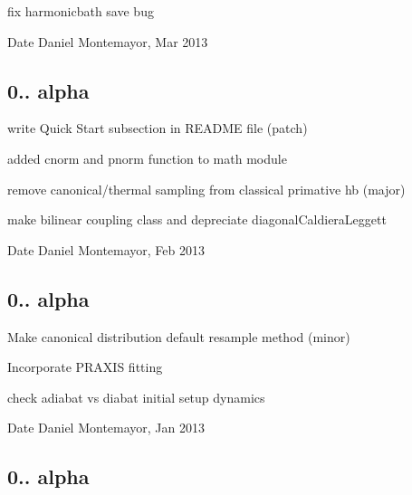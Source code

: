 \begin{DoxyItemize}
\item fix harmonicbath save bug \begin{DoxyDate}{Date}
Daniel Montemayor, Mar 2013
\end{DoxyDate}

\end{DoxyItemize}\hypertarget{_tags_v0_1_3a}{}\subsection{0.. alpha}\label{_tags_v0_1_3a}

\begin{DoxyItemize}
\item write Quick Start subsection in R\-E\-A\-D\-M\-E file (patch)
\item added cnorm and pnorm function to math module
\item remove canonical/thermal sampling from classical primative hb (major)
\item make bilinear coupling class and depreciate diagonal\-Caldiera\-Leggett \begin{DoxyDate}{Date}
Daniel Montemayor, Feb 2013
\end{DoxyDate}

\end{DoxyItemize}\hypertarget{_tags_v0_1_2a}{}\subsection{0.. alpha}\label{_tags_v0_1_2a}

\begin{DoxyItemize}
\item Make canonical distribution default resample method (minor)
\item Incorporate P\-R\-A\-X\-I\-S fitting
\item check adiabat vs diabat initial setup dynamics \begin{DoxyDate}{Date}
Daniel Montemayor, Jan 2013
\end{DoxyDate}

\end{DoxyItemize}\hypertarget{_tags_v0_1_1a}{}\subsection{0.. alpha}\label{_tags_v0_1_1a}

